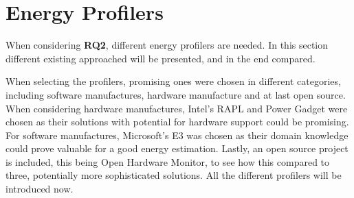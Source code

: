 \section{Energy Profilers}\label{sec:energy_profilers}

When considering \textbf{RQ2}, different energy profilers are needed. In this section different existing approached will be presented, and in the end compared.

When selecting the profilers, promising ones were chosen in different categories, including software manufactures, hardware manufacture and at last open source. When considering hardware manufactures, Intel's RAPL and Power Gadget were chosen as their solutions with potential for hardware support could be promising. For software manufactures, Microsoft's E3 was chosen as their domain knowledge could prove valuable for a good energy estimation. Lastly, an open source project is included, this being Open Hardware Monitor, to see how this compared to three, potentially more sophisticated solutions. All the different profilers will be introduced now.





